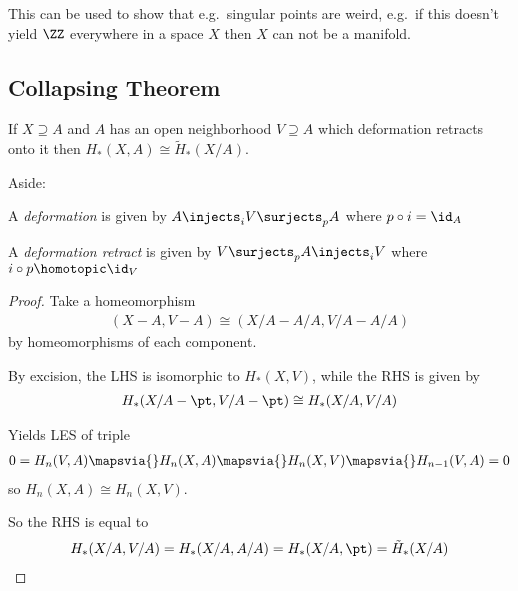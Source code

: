 This can be used to show that e.g.~singular points are weird, e.g.~if
this doesn't yield \(\ZZ\) everywhere in a space \(X\) then \(X\) can
not be a manifold.

\hypertarget{collapsing-theorem}{%
\subsection{Collapsing Theorem}\label{collapsing-theorem}}

If \(X \supseteq A\) and \(A\) has an open neighborhood \(V\supseteq A\)
which deformation retracts onto it then
\(H_*(X,A) \cong \tilde H_*(X/A)\).

Aside:

\begin{definition}[Deformation]

A \emph{deformation} is given by \(A \injects_i V \surjects_p A\) where
\(p\circ i = \id_A\)

\end{definition}

\begin{definition}

A \emph{deformation retract} is given by
\(V \surjects_p A \injects_i V\) where \(i\circ p \homotopic \id_V\)

\end{definition}

\begin{proof}

Take a homeomorphism
\begin{align*}
(X-A, V-A) \cong (X/A - A/A, V/A - A/A)
\end{align*} by homeomorphisms of each component.

By excision, the LHS is isomorphic to \(H_*(X, V)\), while the RHS is
given by
\begin{align*}
H_*(X/A - \pt, V/A - \pt) \cong H_*(X/A, V/A)
\end{align*}

Yields LES of triple
\begin{align*}
0=H_n(V,A) \mapsvia{} H_n(X, A) \mapsvia{} H_n(X,V) \mapsvia{} H_{n-1}(V,A) = 0
\end{align*} so \(H_n(X,A) \cong H_n(X,V)\).

So the RHS is equal to
\begin{align*}
H_*(X/A, V/A) = H_*(X/A, A/A) = H_*(X/A, \pt) = \tilde H_*(X/A)
\end{align*}

\end{proof}

